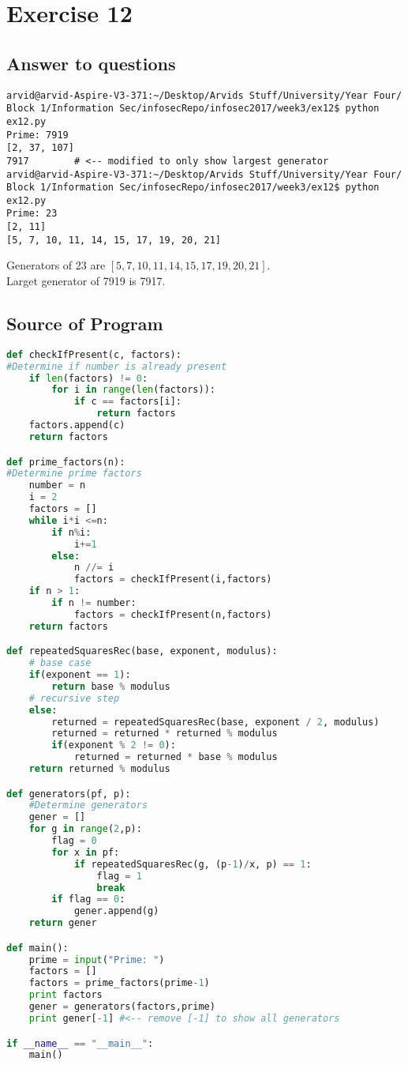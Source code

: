\documentclass[a4paper]{article}
\begin{document}
\section*{Exercise 12}

\subsection*{Answer to questions}

\begin{verbatim}
arvid@arvid-Aspire-V3-371:~/Desktop/Arvids Stuff/University/Year Four/
Block 1/Information Sec/infosecRepo/infosec2017/week3/ex12$ python ex12.py
Prime: 7919
[2, 37, 107]
7917 		# <-- modified to only show largest generator
arvid@arvid-Aspire-V3-371:~/Desktop/Arvids Stuff/University/Year Four/
Block 1/Information Sec/infosecRepo/infosec2017/week3/ex12$ python ex12.py
Prime: 23
[2, 11]
[5, 7, 10, 11, 14, 15, 17, 19, 20, 21]
\end{verbatim}
Generators of 23 are $[5, 7, 10, 11, 14, 15, 17, 19, 20, 21]$.\\
Larget generator of 7919 is 7917.

\subsection*{Source of Program}

\begin{lstlisting}[language=Python]
def checkIfPresent(c, factors):
#Determine if number is already present
	if len(factors) != 0:
		for i in range(len(factors)):
			if c == factors[i]:
				return factors
	factors.append(c)
	return factors

def prime_factors(n):
#Determine prime factors
	number = n
	i = 2
	factors = []
	while i*i <=n:
		if n%i:
			i+=1
		else:
			n //= i
			factors = checkIfPresent(i,factors)
	if n > 1:
		if n != number:
			factors = checkIfPresent(n,factors)
	return factors

def repeatedSquaresRec(base, exponent, modulus):
	# base case
	if(exponent == 1):
		return base % modulus
	# recursive step
	else:
		returned = repeatedSquaresRec(base, exponent / 2, modulus)
		returned = returned * returned % modulus
		if(exponent % 2 != 0):
			returned = returned * base % modulus
	return returned % modulus

def generators(pf, p):
	#Determine generators
	gener = []
	for g in range(2,p):
		flag = 0
		for x in pf:
			if repeatedSquaresRec(g, (p-1)/x, p) == 1:
				flag = 1
				break
		if flag == 0:
			gener.append(g)
	return gener

def main():
	prime = input("Prime: ")
	factors = []
	factors = prime_factors(prime-1)
	print factors
	gener = generators(factors,prime)
	print gener[-1] #<-- remove [-1] to show all generators

if __name__ == "__main__":
    main()
\end{lstlisting}
\end{document}
